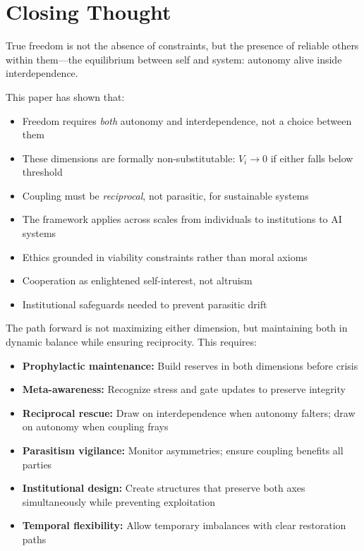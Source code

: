 \documentclass[11pt,a4paper]{article}
\begin{document}
\section{Closing Thought}

True freedom is not the absence of constraints, but the presence of reliable others within them---the equilibrium between self and system: autonomy alive inside interdependence.

This paper has shown that:
\begin{itemize}
    \item Freedom requires \emph{both} autonomy and interdependence, not a choice between them
    \item These dimensions are formally non-substitutable: $V_i \to 0$ if either falls below threshold
    \item Coupling must be \emph{reciprocal}, not parasitic, for sustainable systems
    \item The framework applies across scales from individuals to institutions to AI systems
    \item Ethics grounded in viability constraints rather than moral axioms
    \item Cooperation as enlightened self-interest, not altruism
    \item Institutional safeguards needed to prevent parasitic drift
\end{itemize}

The path forward is not maximizing either dimension, but maintaining both in dynamic balance while ensuring reciprocity. This requires:
\begin{itemize}
    \item \textbf{Prophylactic maintenance:} Build reserves in both dimensions before crisis
    \item \textbf{Meta-awareness:} Recognize stress and gate updates to preserve integrity
    \item \textbf{Reciprocal rescue:} Draw on interdependence when autonomy falters; draw on autonomy when coupling frays
    \item \textbf{Parasitism vigilance:} Monitor asymmetries; ensure coupling benefits all parties
    \item \textbf{Institutional design:} Create structures that preserve both axes simultaneously while preventing exploitation
    \item \textbf{Temporal flexibility:} Allow temporary imbalances with clear restoration paths
\end{itemize}
\end{document}
